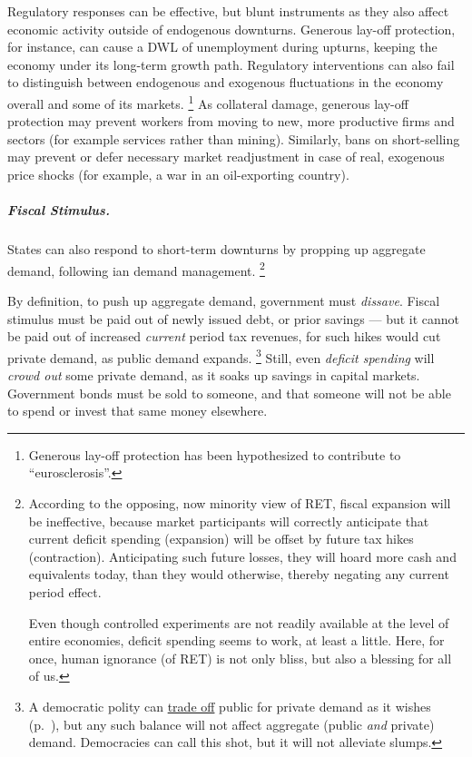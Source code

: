 Regulatory responses can be effective, but blunt instruments as they also affect economic activity outside of endogenous downturns.
Generous lay-off protection, for instance, can cause a \gls{DWL} of unemployment during upturns, keeping the economy under its long-term growth path.
Regulatory interventions can also fail to distinguish between endogenous and exogenous fluctuations in the economy overall and some of its markets.
\footnote{
	Generous lay-off protection has been hypothesized to contribute to ``eurosclerosis''.
}
As collateral damage, generous lay-off protection may prevent workers from moving to new, more productive firms and sectors (for example services rather than mining).
Similarly, bans on short-selling may prevent or defer necessary market readjustment in case of real, exogenous price shocks (for example, a war in an oil-exporting country).

\subparagraph{Fiscal Stimulus.}
	\label{sec:fiscal-stimulus}
States can also respond to short-term downturns by propping up aggregate demand, following \citeauthor{Keynes1936}ian demand management.
\footnote{
	According to the opposing, now minority view of \gls{RET}, fiscal expansion will be ineffective, because market participants will correctly anticipate that current deficit spending (expansion) will be offset by future tax hikes (contraction).
	Anticipating such future losses, they will hoard more cash and equivalents today, than they would otherwise, thereby negating any current period effect.

	Even though controlled experiments are not readily available at the level of entire economies, deficit spending seems to work, at least a little.
	Here, for once, human ignorance (of \gls{RET}) is not only bliss, but also a blessing for all of us.
}

By definition, to push up aggregate demand, government must \emph{dissave}.
Fiscal stimulus must be paid out of newly issued debt, or prior savings --- but it cannot be paid out of increased \emph{current} period tax revenues, for such hikes would cut private demand, as public demand expands.
\footnote{
	A democratic polity can \hyperref[sec:trade-offs]{trade off} public for private demand as it wishes (p.~\pageref{sec:trade-offs}), but any such balance will not affect aggregate (public \emph{and} private) demand.
	Democracies can call this shot, but it will not alleviate slumps.
}
Still, even \emph{deficit spending} will \emph{crowd out} some private demand, as it soaks up savings in capital markets.
Government bonds must be sold to someone, and that someone will not be able to spend or invest that same money elsewhere.

